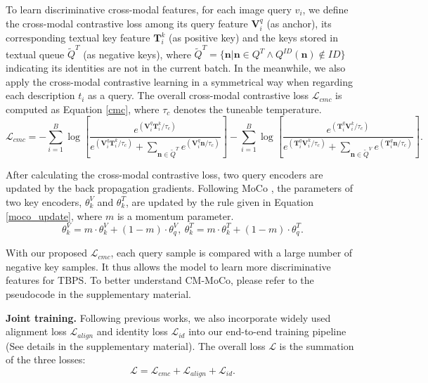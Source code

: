 \documentclass{bmvc2k}
\newcommand{\statement}[1]{\noindent\textbf{#1}}
\begin{document}
To learn discriminative cross-modal features, for each image query $v_i$, we define the cross-modal contrastive loss among its query feature $\mathbf{V}_i^q$ (as anchor), its corresponding textual key feature $\mathbf{T}_i^k$ (as positive key) and the keys stored in textual queue $\widetilde{Q}^T$ (as negative keys), where $\widetilde{Q}^T=\{\mathbf{n}|\mathbf{n}\in Q^T \wedge Q^{ID}(\mathbf{n})\notin ID\}$ indicating its identities are not in the current batch. 
In the meanwhile, we also apply the cross-modal contrastive learning in a symmetrical way when regarding each description $t_i$ as a query. 
The overall cross-modal contrastive loss $\mathcal{L}_{cmc}$ is computed as Equation \ref{cmc}, where $\tau_c$ denotes the tuneable temperature.
\begin{equation}
\mathcal{L}_{cmc}=-\sum_{i=1}^{B} \log\left[\frac{e^{\left(\mathbf{V}_i^q \mathbf{T}_i^k / \tau_c\right)}}{e^{ \left(\mathbf{V}_i^q \mathbf{T}_i^k / \tau_c\right)}+\displaystyle\sum\limits_{\mathbf{n}\in \widetilde{Q}^T} e^{\left(\mathbf{V}_i^q \mathbf{n} / \tau_c\right)}}\right] -\sum_{i=1}^{B} \log\left[\frac{e^{\left(\mathbf{T}_i^q\mathbf{V}_i^k / \tau_c\right)}}{e^{ \left(\mathbf{T}_i^q  \mathbf{V}_i^k / \tau_c\right)}+\displaystyle\sum\limits_{\mathbf{n}\in \widetilde{Q}^V} e^{\left(\mathbf{T}_i^q \mathbf{n} / \tau_c\right)}}\right].
\label{cmc}
\end{equation}

After calculating the cross-modal contrastive loss, two query encoders are updated by the back propagation gradients. 
Following MoCo \cite{he2020moco}, the parameters of two key encoders, $\theta_{k}^{V}$ and $\theta_{k}^{T}$, are updated by the rule given in Equation \ref{moco_update}, where $m$ is a momentum parameter.
\begin{equation}
\theta_{k}^{V}=m \cdot \theta_{k}^{V}+(1-m) \cdot \theta^{V}_{q} ,\ \theta_{k}^{T}=m \cdot \theta_{k}^{T}+(1-m) \cdot \theta^{T}_{q}.
\label{moco_update}
\end{equation}

With our proposed $\mathcal{L}_{cmc}$, each query sample is compared with a large number of negative key samples. 
It thus allows the model to learn more discriminative features for TBPS. 
To better understand CM-MoCo, please refer to the pseudocode in the supplementary material.

\statement{Joint training.} Following previous works, we also incorporate widely used alignment loss $\mathcal{L}_{align}$ \cite{wang2020vitaa} and identity loss $\mathcal{L}_{id}$ \cite{luo2019strong,zheng2020dual} into our end-to-end training pipeline (See details in the supplementary material). 
The overall loss $\mathcal{L}$ is the summation of the three losses:
\begin{equation}
\label{all_loss}
\mathcal{L}=\mathcal{L}_{cmc}+\mathcal{L}_{align}+\mathcal{L}_{id}.
\end{equation}
\end{document}
